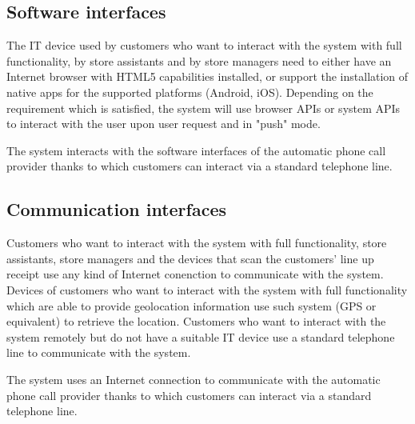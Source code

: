 \documentclass[../../main.tex]{subfiles}
\begin{document}
\subsection{Software interfaces}

The IT device used by customers who want to interact with the system with full functionality, by store assistants and by store managers need to either have an Internet browser with HTML5 capabilities installed, or support the installation of native apps for the supported platforms (Android, iOS). Depending on the requirement which is satisfied, the system will use browser APIs or system APIs to interact with the user upon user request and in "push" mode.

The system interacts with the software interfaces of the automatic phone call provider thanks to which customers can interact via a standard telephone line.

\subsection{Communication interfaces}

Customers who want to interact with the system with full functionality, store assistants, store managers and the devices that scan the customers' line up receipt use any kind of Internet conenction to communicate with the system. Devices of customers who want to interact with the system with full functionality which are able to provide geolocation information use such system (GPS or equivalent) to retrieve the location. Customers who want to interact with the system remotely but do not have a suitable IT device use a standard telephone line to communicate with the system.

The system uses an Internet connection to communicate with the automatic phone call provider thanks to which customers can interact via a standard telephone line.
\end{document}
